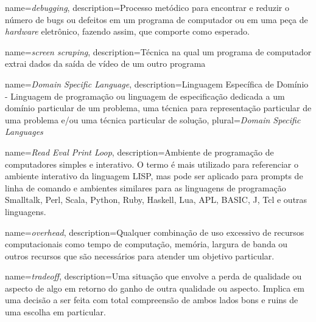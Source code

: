 				{name={\emph{debugging}},
				 description={Processo metódico para encontrar e reduzir o número de bugs ou defeitos em um programa de computador ou em uma peça de \emph{hardware} eletrônico, fazendo assim, que comporte como esperado.}
				}

				{name={\emph{screen scraping}},
				 description={Técnica na qual um programa de computador extrai dados da saída de vídeo de um outro programa}
				}
				
				{name={\emph{Domain Specific Language}},
				 description={Linguagem Específica de Domínio - Linguagem de programação ou linguagem de especificação dedicada a um domínio particular de um problema, uma técnica para representação particular de uma problema e/ou uma técnica particular de solução},
				 plural={\emph{Domain Specific Languages}}
				}
				
				{name={\emph{Read Eval Print Loop}},
				 description={Ambiente de programação de computadores simples e interativo. O termo é mais utilizado para referenciar o ambiente interativo da linguagem LISP, mas pode ser aplicado para prompts de linha de comando e ambientes similares para as linguagens de programação Smalltalk, Perl, Scala, Python, Ruby, Haskell, Lua, APL, BASIC, J, Tcl e outras linguagens.}
				}

				{name={\emph{overhead}},
				 description={Qualquer combinação de uso excessivo de recursos computacionais como tempo de computação, memória, largura de banda ou outros recursos que são necessários para atender um objetivo particular.}
				}

				{name={\emph{tradeoff}},
				 description={Uma situação que envolve a perda de qualidade ou aspecto de algo em retorno do ganho de outra qualidade ou aspecto. Implica em uma decisão a ser feita com total compreensão de ambos lados bons e ruins de uma escolha em particular.}
				}